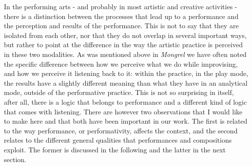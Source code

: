 \documentclass[11pt]{article}
\begin{document}
In the performing arts - and probably in most artistic and creative
activities - there is a distinction between the processes that lead up
to a performance and the perception and results of the
performance. This is not to say that they are isolated from each
other, nor that they do not overlap in several important ways, but
rather to point at the difference in the way the artistic practice is
perceived in these two modalities. As was mentioned above in
\emph{Mongrel} we have often noted the specific difference between how
we perceive what we do while improvising, and how we perceive it
listening back to it: within the practice, in the play mode, the
results have a slightly different meaning than what they have in an
analytical mode, outside of the performative practice. This is not so
surprising in itself, after all, there is a logic that belongs to
performance and a different kind of logic that comes with
listening. There are however two observations that I would like to
make here and that both have been important in our work. The first is
related to the way performance, or performativity, affects the
context, and the second relates to the different general qualities
that performances and compositions exploit. The former is discussed in
the following and the latter in the next section.
\end{document}

